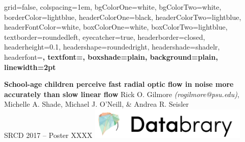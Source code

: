 \documentclass[landscape,final,a0paper,fontscale=0.285]{baposter}
\begin{document}


\begin{poster}%
  {
  grid=false,
  colspacing=1em,
  bgColorOne=white,
  bgColorTwo=white,
  borderColor=lightblue,
  headerColorOne=black,
  headerColorTwo=lightblue,
  headerFontColor=white,
  boxColorOne=white,
  boxColorTwo=lightblue,
  textborder=roundedleft,
  eyecatcher=true,
  headerborder=closed,
  headerheight=0.1\textheight,
  headershape=roundedright,
  headershade=shadelr,
  headerfont=\Large\bf\textsc, %
  textfont={\setlength{\parindent}{1.5em}},
  boxshade=plain,
  background=plain,
  linewidth=2pt
  }

  {\bf{School-age children perceive fast radial optic flow in noise more accurately than slow linear flow} \vspace{0.2em}}
  {Rick O. Gilmore \emph{(rogilmore@psu.edu)}, Michelle A. Shade, Michael J. O'Neill, \& Andrea R. Seisler\\ \vspace{0.2em}
  SRCD 2017 -- Poster XXXX}
 {\includegraphics[height=4em]{img/databrary.png}}



\end{poster}
\end{document}
